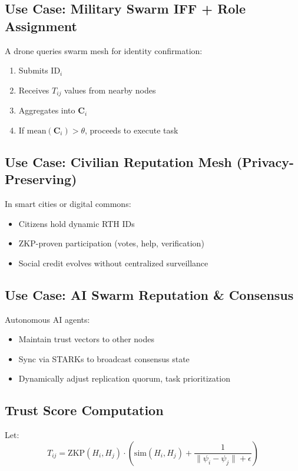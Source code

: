 \documentclass{article}
\begin{document}
\subsection*{Use Case: Military Swarm IFF + Role Assignment}

A drone queries swarm mesh for identity confirmation:
\begin{enumerate}
    \item Submits \( \text{ID}_i \)
    \item Receives \( T_{ij} \) values from nearby nodes
    \item Aggregates into \( \mathbf{C}_i \)
    \item If \( \text{mean}(\mathbf{C}_i) > \theta \), proceeds to execute task
\end{enumerate}

\subsection*{Use Case: Civilian Reputation Mesh (Privacy-Preserving)}

In smart cities or digital commons:
\begin{itemize}
    \item Citizens hold dynamic RTH IDs
    \item ZKP-proven participation (votes, help, verification)
    \item Social credit evolves without centralized surveillance
\end{itemize}

\subsection*{Use Case: AI Swarm Reputation & Consensus}

Autonomous AI agents:
\begin{itemize}
    \item Maintain trust vectors to other nodes
    \item Sync via STARKs to broadcast consensus state
    \item Dynamically adjust replication quorum, task prioritization
\end{itemize}

\subsection*{Trust Score Computation}

Let:
\[
T_{ij} = \text{ZKP}(H_i, H_j) \cdot \left( \text{sim}(H_i, H_j) + \frac{1}{\|\psi_i - \psi_j\| + \epsilon} \right)
\]
\end{document}
